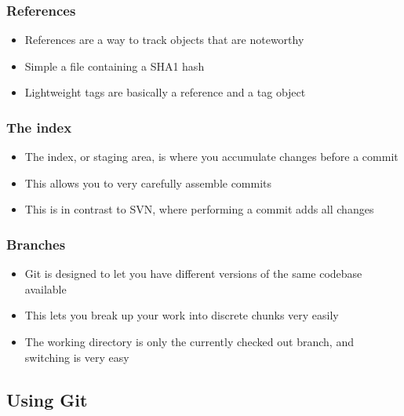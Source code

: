 \documentclass{beamer}
\begin{document}
\begin{frame}
  \frametitle{References}
  \begin{itemize}
    \item References are a way to track objects that are noteworthy
    \item Simple a file containing a SHA1 hash
    \item Lightweight tags are basically a reference and a tag object
  \end{itemize}
\end{frame}

\begin{frame}
  \frametitle{The index}
  \begin{itemize}
    \item The index, or staging area, is where you accumulate changes before a commit
    \item This allows you to very carefully assemble commits
    \item This is in contrast to SVN, where performing a commit adds all changes
  \end{itemize}
\end{frame}

\begin{frame}
  \frametitle{Branches}
  \begin{itemize}
    \item Git is designed to let you have different versions of the same codebase available
    \item This lets you break up your work into discrete chunks very easily
    \item The working directory is only the currently checked out branch, and switching is very easy
  \end{itemize}
\end{frame}

\subsection{Using Git}
\end{document}
